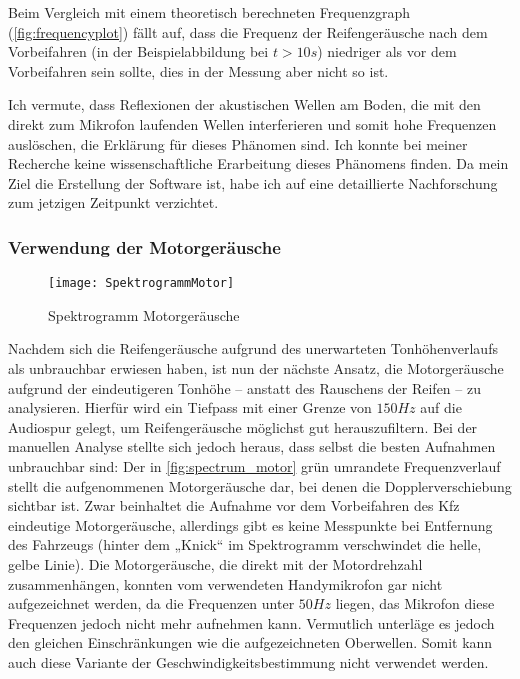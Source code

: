 Beim Vergleich mit einem theoretisch berechneten Frequenzgraph (\autoref{fig:frequencyplot}) fällt auf, dass die Frequenz der Reifengeräusche nach dem Vorbeifahren (in der Beispielabbildung bei \(t > 10 s\)) niedriger als vor dem Vorbeifahren sein sollte, dies in der Messung aber nicht so ist.

Ich vermute, dass Reflexionen der akustischen Wellen am Boden, die mit den direkt zum Mikrofon laufenden Wellen interferieren und somit hohe Frequenzen auslöschen, die Erklärung für dieses Phänomen sind. Ich konnte bei meiner Recherche keine wissenschaftliche Erarbeitung dieses Phänomens finden. Da mein Ziel die Erstellung der Software ist, habe ich auf eine detaillierte Nachforschung zum jetzigen Zeitpunkt verzichtet.

\subsubsection{Verwendung der Motorgeräusche}

\begin{figure}[h]
    \centering
    \texttt{[image: SpektrogrammMotor]}
    \caption{Spektrogramm Motorgeräusche}
    \label{fig:spectrum_motor}
\end{figure}

Nachdem sich die Reifengeräusche aufgrund des unerwarteten Tonhöhenverlaufs als unbrauchbar erwiesen haben, ist nun der nächste Ansatz, die Motorgeräusche aufgrund der eindeutigeren Tonhöhe -- anstatt des Rauschens der Reifen -- zu analysieren. Hierfür wird ein Tiefpass mit einer Grenze von \(150 Hz\) auf die Audiospur gelegt, um Reifengeräusche möglichst gut herauszufiltern. Bei der manuellen Analyse stellte sich jedoch heraus, dass selbst die besten Aufnahmen unbrauchbar sind: Der in \autoref{fig:spectrum_motor} grün umrandete Frequenzverlauf stellt die aufgenommenen Motorgeräusche dar, bei denen die Dopplerverschiebung sichtbar ist. Zwar beinhaltet die Aufnahme vor dem Vorbeifahren des Kfz eindeutige Motorgeräusche, allerdings gibt es keine Messpunkte bei Entfernung des Fahrzeugs (hinter dem „Knick“ im Spektrogramm verschwindet die helle, gelbe Linie). Die Motorgeräusche, die direkt mit der Motordrehzahl zusammenhängen, konnten vom verwendeten Handymikrofon gar nicht aufgezeichnet werden, da die Frequenzen unter \(50 Hz\) liegen, das Mikrofon diese Frequenzen jedoch nicht mehr aufnehmen kann. Vermutlich unterläge es jedoch den gleichen Einschränkungen wie die aufgezeichneten Oberwellen. Somit kann auch diese Variante der Geschwindigkeitsbestimmung nicht verwendet werden.


